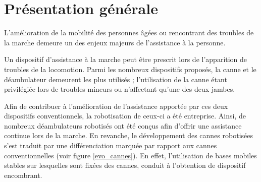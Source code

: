 

\section{Présentation générale}

L'amélioration de la mobilité des personnes âgées ou rencontrant des troubles de la marche demeure un des enjeux majeurs de l'assistance à la personne.

Un dispositif d'assistance à la marche peut être prescrit lors de l'apparition de troubles de la locomotion. Parmi les nombreux dispositifs proposés, la canne et le déambulateur demeurent les plus utilisés ; l'utilisation de la canne étant privilégiée lors de troubles mineurs ou n'affectant qu'une des deux jambes.

Afin de contribuer à l'amélioration de l'assistance apportée par ces deux dispositifs conventionnels, la robotisation de ceux-ci a été entreprise. Ainsi, de nombreux déambulateurs robotisés ont été conçus afin d'offrir une assistance continue lors de la marche. En revanche, le développement des cannes robotisées s'est traduit par une différenciation marquée par rapport aux cannes conventionnelles (voir figure \ref{evo_cannes}). En effet, l'utilisation de bases mobiles stables sur lesquelles sont fixées des cannes, conduit à l'obtention de dispositif encombrant.

